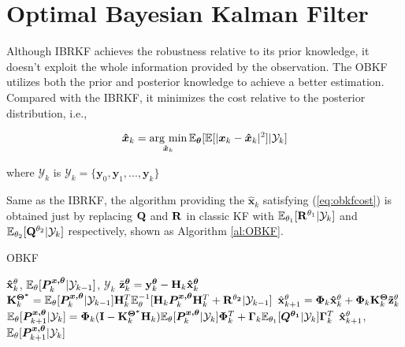 \section{Optimal Bayesian Kalman Filter\label{sec: obkf}}

Although IBRKF achieves the robustness relative to its prior knowledge, it doesn't exploit the whole information provided by the observation. The OBKF utilizes both the prior and posterior knowledge to achieve a better estimation. Compared with the IBRKF, it minimizes the cost relative to the posterior distribution, i.e., 

\begin{align} \label{eq:obkfcost}
    \bm{\hat x}_k = \mathop{\rm arg~min}\limits_{\bm{\hat x}_k}\mathbb{E}_{\bm{\theta}}[\mathbb{E}[|\bm{x}_k-\bm{\hat x}_k|^2]|\mathcal{Y}_k]
\end{align}

where $\mathcal{Y}_k$ is $\mathcal{Y}_k=\{\bm{y}_0, \bm{y}_1, ..., \bm{y}_k\}$

Same as the IBRKF, the algorithm providing the $\bm{\hat x}_k$ satisfying (\ref{eq:obkfcost}) is obtained just by replacing ${\bf Q}$ and ${\bf R}$ in classic KF with $\mathbb{E}_{\theta_1}[{\bf R}^{\theta_1}|\mathcal{Y}_k]$ and $\mathbb{E}_{\theta_2}[{\bf Q}^{\theta_2}|\mathcal{Y}_k]$ respectively, shown as Algorithm \ref{al:OBKF}.

\begin{algorithm}[]
\caption{OBKF}
\begin{algorithmic}[1]
    \label{al:OBKF}
\REQUIRE ${\bf \hat x}^{\theta}_k$, $\mathbb{E}_{\theta}[\bm{P^{x, \theta}}_{k}|\mathcal{Y}_{k-1}]$, $\mathcal{Y}_k$
\STATE $\tilde {\bf z}^{\bm{\theta}}_k = {\bf y}^{\bm{\theta}}_k - {\bf H}_k{\bf \hat x}^{\bm{\theta}}_k$
\STATE ${\bf K}^{\bm {\Theta^*}}_k = \mathbb{E}_{\theta}[\bm{P^{x, \theta}}_k|\mathcal{Y}_{k-1}]{\bf H}^T_k\mathbb{E}_{\theta}^{-1}[{\bf H}_k\bm{P^{x, \theta}}_k{\bf H}^T_k+{\bf R^{\theta_2}}|\mathcal{Y}_{k-1}]$
\STATE $\hat{\bf x}^{\theta}_{k+1} = {\bm {\Phi}}_k{\bf \hat x}^{\theta}_k+{\bm {\Phi}}_k{\bf K}^{\bm {\Theta}}_k{\bf \tilde z}^{\theta}_k$
\STATE $\mathbb{E}_{\theta}[\bm{P^{x, \theta}}_{k+1}|\mathcal{Y}_k] = \bm{\Phi}_k({\bf I}-{\bf K}^{\bm {\Theta^*}}_k{\bf H}_k)\mathbb{E}_{\theta}[\bm{P^{x, \theta}}_k|\mathcal{Y}_k]{\bm {\Phi}}^T_k + {\bm {\Gamma}}_k\mathbb{E}_{\theta_1}[{\bm {Q^{\theta_1}}}|\mathcal{Y}_k]{\bm {\Gamma}}_k^T$
\ENSURE ${\bf \hat x}^{\theta}_{k+1}$, $\mathbb{E}_{\theta}[\bm{P^{x, \theta}}_{k+1}|\mathcal{Y}_{k}]$
\end{algorithmic}
\end{algorithm}

